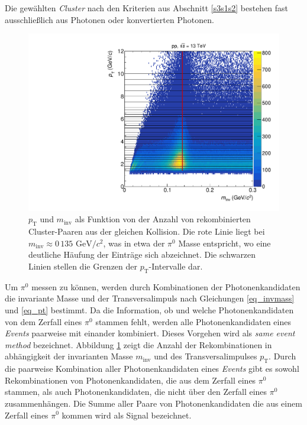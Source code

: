 Die gewählten \textit{Cluster} nach den Kriterien aus Abschnitt \ref{s3s1s2} bestehen fast ausschließlich aus Photonen oder konvertierten Photonen.
\newline
\begin{figure}[tp]
\centering
\includegraphics[width=.7\linewidth]{hInvMass_pT_Signal.pdf}
\caption{$p_\text{T}$ und $m_\text{inv}$ als Funktion von der Anzahl von rekombinierten  Cluster-Paaren aus der gleichen Kollision.
Die rote Linie liegt bei $m_{\text{inv}}\approx0\,135\text{ GeV/}c^{2}$, was in etwa der $\pi^{0}$ Masse entspricht, wo eine deutliche Häufung der Einträge sich abzeichnet.
Die schwarzen Linien stellen die Grenzen der $p_{\text{T}}$-Intervalle dar.}
\label{figInvMassPt_a}
\end{figure}
Um $\pi^{0}$ messen zu können, werden durch Kombinationen der Photonenkandidaten die invariante Masse und der Transversalimpuls nach Gleichungen \ref{eq_invmass} und \ref{eq_pt} bestimmt.
Da die Information, ob und welche Photonenkandidaten von dem Zerfall eines $\pi^{0}$ stammen fehlt, werden alle Photonenkandidaten eines \textit{Events} paarweise mit einander kombiniert.
Dieses Vorgehen wird als \textit{same event method} bezeichnet.
Abbildung \ref{figInvMassPt_a} zeigt die Anzahl der Rekombinationen in abhängigkeit der invarianten Masse $m_{\text{inv}}$ und des Transversalimpulses $p_{\text{T}}$.
Durch die paarweise Kombination aller Photonenkandidaten eines \textit{Events} gibt es sowohl Rekombinationen von Photonenkandidaten, die aus dem Zerfall eines $\pi^{0}$ stammen, als auch Photonenkandidaten, die nicht über den Zerfall eines $\pi^{0}$ zusammenhängen.
Die Summe aller Paare von Photonenkandidaten die aus einem Zerfall eines $\pi^{0}$ kommen wird als Signal bezeichnet.
